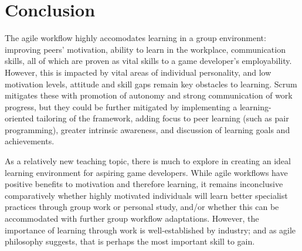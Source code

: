 \documentclass{scrartcl}
\begin{document}
\section{Conclusion}
The agile workflow highly accomodates learning in a group environment: improving peers' motivation, ability to learn in the workplace, communication skills, all of which are proven as vital skills to a game developer's employability. However, this is impacted by vital areas of individual personality, and low motivation levels, attitude and skill gaps remain key obstacles to learning. Scrum mitigates these with promotion of autonomy and strong communication of work progress, but they could be further mitigated by implementing a learning-oriented tailoring of the framework, adding focus to peer learning (such as pair programming), greater intrinsic awareness, and discussion of learning goals and achievements.

As a relatively new teaching topic, there is much to explore in creating an ideal learning environment for aspiring game developers. While agile workflows have positive benefits to motivation and therefore learning, it remains inconclusive comparatively whether highly motivated individuals will learn better specialist practices through group work or personal study, and/or whether this can be accommodated with further group workflow adaptations. However, the importance of learning through work is well-established by industry; and as agile philosophy suggests, that is perhaps the most important skill to gain.


 

\end{document}
